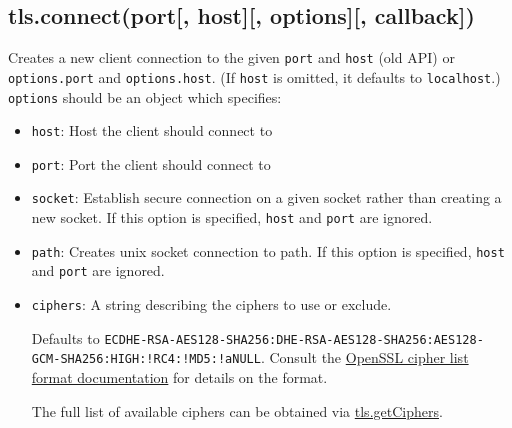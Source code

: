 \subsection{tls.connect(port{[}, host{]}{[}, options{]}{[},
callback{]})}\label{tls.connectport-host-options-callback}

Creates a new client connection to the given \texttt{port} and
\texttt{host} (old API) or \texttt{options.port} and
\texttt{options.host}. (If \texttt{host} is omitted, it defaults to
\texttt{localhost}.) \texttt{options} should be an object which
specifies:

\begin{itemize}
\item
  \texttt{host}: Host the client should connect to
\item
  \texttt{port}: Port the client should connect to
\item
  \texttt{socket}: Establish secure connection on a given socket rather
  than creating a new socket. If this option is specified, \texttt{host}
  and \texttt{port} are ignored.
\item
  \texttt{path}: Creates unix socket connection to path. If this option
  is specified, \texttt{host} and \texttt{port} are ignored.
\item
  \texttt{ciphers}: A string describing the ciphers to use or exclude.

  Defaults to
  \texttt{ECDHE-RSA-AES128-SHA256:DHE-RSA-AES128-SHA256:AES128-GCM-SHA256:HIGH:!RC4:!MD5:!aNULL}.
  Consult the
  \href{http://www.openssl.org/docs/apps/ciphers.html\#CIPHER_LIST_FORMAT}{OpenSSL
  cipher list format documentation} for details on the format.

  The full list of available ciphers can be obtained via
  \hyperref[tlsux5ftlsux5fgetciphers]{tls.getCiphers}.


\end{itemize}
